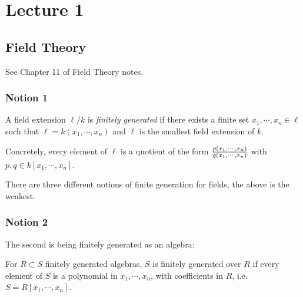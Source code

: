 \newpage

\tableofcontents
\newpage

\hypertarget{lecture-1}{%
\section{Lecture 1}\label{lecture-1}}

\hypertarget{field-theory}{%
\subsection{Field Theory}\label{field-theory}}

See Chapter 11 of Field Theory notes.

\hypertarget{notion-1}{%
\subsubsection{Notion 1}\label{notion-1}}

\begin{definition}

A field extension \(\ell/k\) is \emph{finitely generated} if there
exists a finite set \(x_1, \cdots, x_n \in \ell\) such that
\(\ell = k(x_1, \cdots, x_n)\) and \(\ell\) is the smallest field
extension of \(k\).

Concretely, every element of \(\ell\) is a quotient of the form
\({p(x_1, \cdots, x_n) \over q(x_1, \cdots, x_n)}\) with
\(p, q\in k[x_1, \cdots, x_n]\).

\end{definition}

There are three different notions of finite generation for fields, the
above is the weakest.

\hypertarget{notion-2}{%
\subsubsection{Notion 2}\label{notion-2}}

The second is being finitely generated as an algebra:

\begin{definition}

For \(R\subset S\) finitely generated algebras, \(S\) is finitely
generated over \(R\) if every element of \(S\) is a polynomial in
\(x_1, \cdots, x_n\), with coefficients in \(R\),
i.e.~\(S = R[x_1, \cdots, x_n]\).

\end{definition}

